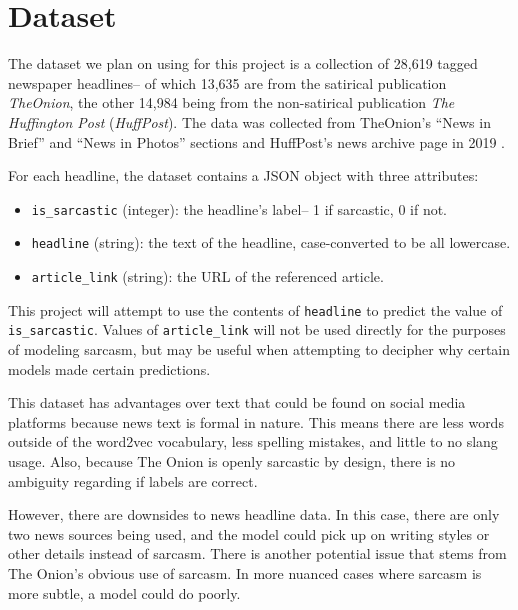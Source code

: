 \documentclass[11pt]{article}
\begin{document}
\section{Dataset}

The dataset we plan on using for this project is a collection of 28,619 tagged
newspaper headlines-- of which 13,635 are from the satirical publication
\textit{TheOnion}, the other 14,984 being from the non-satirical publication
\textit{The Huffington Post} (\textit{HuffPost}). The data was collected from
TheOnion's ``News in Brief'' and ``News in Photos'' sections and HuffPost's
news archive page in 2019
\cite{misra2023Sarcasm}.

For each headline, the dataset contains a JSON object with three attributes:
\begin{itemize}
    \item \texttt{is\_sarcastic} (integer): the headline's label-- 1 if
        sarcastic, 0 if not.
    \item \texttt{headline} (string): the text of the headline, case-converted
        to be all lowercase.
    \item \texttt{article\_link} (string): the URL of the referenced article.
\end{itemize}

This project will attempt to use the contents of \texttt{headline} to predict
the value of \texttt{is\_sarcastic}. Values of \texttt{article\_link} will not
be used directly for the purposes of modeling sarcasm, but may be useful when
attempting to decipher why certain models made certain predictions.

This dataset has advantages over text that could be found on social media
platforms because news text is formal in nature. This means there are less
words outside of the word2vec vocabulary, less spelling mistakes, and little to
no slang usage. Also, because The Onion is openly sarcastic by design, there is
no ambiguity regarding if labels are correct.

However, there are downsides to news headline data. In this case, there are
only two news sources being used, and the model could pick up on writing styles
or other details instead of sarcasm. There is another potential issue that
stems from The Onion's obvious use of sarcasm. In more nuanced cases where
sarcasm is more subtle, a model could do poorly.
\end{document}
